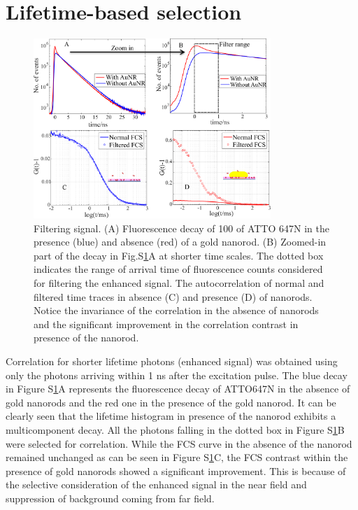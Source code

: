 \documentclass[11pt,a4paper,onecolumn]{article}
\begin{document}
\section{Lifetime-based selection}
\begin{figure}[ht]
  \centering
  \includegraphics[width=0.8\textwidth]{lifetime_filtering.png}
  \makeatletter
  \renewcommand{\fnum@figure}{\figurename~S\thefigure}
  \makeatother{}
  \caption{Filtering signal. (A) Fluorescence decay of \SI{100}{\nM} of ATTO 647N in the presence (blue) and absence (red) of a gold nanorod.
  (B) Zoomed-in part of the decay in Fig.S\ref{SIfig:lifetime-filtering}A at shorter time scales. 
  The dotted box indicates the range of arrival time of fluorescence counts considered for filtering the enhanced signal.
  The autocorrelation of normal and filtered time traces in absence (C) and presence (D) of nanorods. 
  Notice the invariance of the correlation in the absence of nanorods and the significant improvement in the correlation contrast in presence of the nanorod.}
  \label{SIfig:lifetime-filtering}
\end{figure}
Correlation for shorter lifetime photons (enhanced signal) was obtained using only the photons arriving within 1 ns after the excitation pulse.
The blue decay in Figure S\ref{SIfig:lifetime-filtering}A represents the fluorescence decay of ATTO647N in the absence of gold nanorods and the red one in the presence of the gold nanorod. It can be clearly seen that the lifetime histogram in presence of the nanorod exhibits a multicomponent decay.
All the photons falling in the dotted box in Figure S\ref{SIfig:lifetime-filtering}B were selected for correlation.
While the FCS curve in the absence of the nanorod remained unchanged as can be seen in Figure S\ref{SIfig:lifetime-filtering}C, the FCS contrast within the presence of gold nanorods showed a significant improvement.
This is because of the selective consideration of the enhanced signal in the near field and suppression of background coming from far field.
\end{document}

